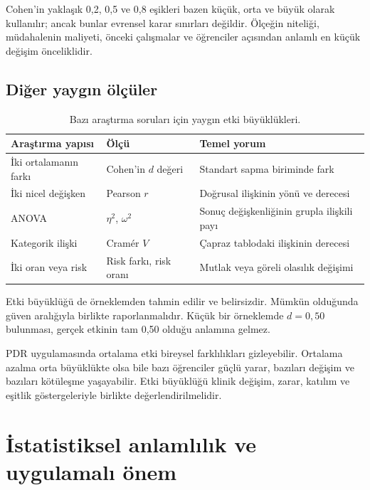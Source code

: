 Cohen'in yaklaşık 0,2, 0,5 ve 0,8 eşikleri bazen küçük, orta ve büyük olarak
kullanılır; ancak bunlar evrensel karar sınırları değildir. Ölçeğin niteliği,
müdahalenin maliyeti, önceki çalışmalar ve öğrenciler açısından anlamlı en
küçük değişim önceliklidir.

\subsection{Diğer yaygın ölçüler}

\begin{table}[htbp]
\centering
\caption{Bazı araştırma soruları için yaygın etki büyüklükleri.}
\begin{tabular}{@{}p{}p{}p{}@{}}
\toprule
Araştırma yapısı & Ölçü & Temel yorum \\
\midrule
İki ortalamanın farkı & Cohen'in $d$ değeri & Standart sapma biriminde fark \\
İki nicel değişken & Pearson $r$ & Doğrusal ilişkinin yönü ve derecesi \\
ANOVA & $\eta^2$, $\omega^2$ & Sonuç değişkenliğinin grupla ilişkili payı \\
Kategorik ilişki & Cramér $V$ & Çapraz tablodaki ilişkinin derecesi \\
İki oran veya risk & Risk farkı, risk oranı & Mutlak veya göreli olasılık değişimi \\
\bottomrule
\end{tabular}
\end{table}

Etki büyüklüğü de örneklemden tahmin edilir ve belirsizdir. Mümkün olduğunda
güven aralığıyla birlikte raporlanmalıdır. Küçük bir örneklemde $d=0{,}50$
bulunması, gerçek etkinin tam 0,50 olduğu anlamına gelmez.

\begin{researchbox}
PDR uygulamasında ortalama etki bireysel farklılıkları gizleyebilir. Ortalama
azalma orta büyüklükte olsa bile bazı öğrenciler güçlü yarar, bazıları değişim
ve bazıları kötüleşme yaşayabilir. Etki büyüklüğü klinik değişim, zarar,
katılım ve eşitlik göstergeleriyle birlikte değerlendirilmelidir.
\end{researchbox}

\section{İstatistiksel anlamlılık ve uygulamalı önem}

